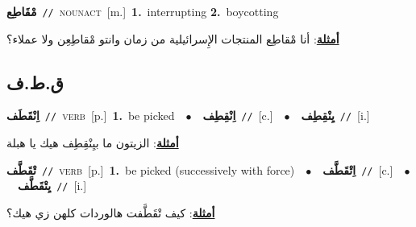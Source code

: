 \documentclass[10pt,a4paper,twoside]{article} %
\begin{document}
\begin{multicols}{2}
{\setlength\topsep{0pt}\textbf{\foreignlanguage{arabic}{مْقَاطِع}}\ {\color{gray}\texttt{//}\color{black}}\ \textsc{noun\textunderscore act}\ [m.]\ \textbf{1.}~interrupting  \textbf{2.}~boycotting\  \begin{flushright}\color{gray}\foreignlanguage{arabic}{\textbf{\underline{\foreignlanguage{arabic}{أمثلة}}}: أنا مْقاطِع المنتجات الإِسرائيلية من زمان وانتو مْقاطِعِن ولا عملاء؟}\end{flushright}\color{black}} \vspace{2mm}

\vspace{-3mm}
\subsection*{\color{blue}\foreignlanguage{arabic}{ق.ط.ف}\color{blue}{}} 

{\setlength\topsep{0pt}\textbf{\foreignlanguage{arabic}{اِنْقَطَف}}\ {\color{gray}\texttt{//}\color{black}}\ \textsc{verb}\ [p.]\ \textbf{1.}~be picked\ \ $\bullet$\ \ \setlength\topsep{0pt}\textbf{\foreignlanguage{arabic}{اِنْقِطِف}}\ {\color{gray}\texttt{//}\color{black}}\ [c.]\ \ $\bullet$\ \ \setlength\topsep{0pt}\textbf{\foreignlanguage{arabic}{يِنْقِطِف}}\ {\color{gray}\texttt{//}\color{black}}\ [i.]\  \begin{flushright}\color{gray}\foreignlanguage{arabic}{\textbf{\underline{\foreignlanguage{arabic}{أمثلة}}}: الزيتون ما بيِنْقِطِف هيك يا هبلة}\end{flushright}\color{black}} \vspace{2mm}

{\setlength\topsep{0pt}\textbf{\foreignlanguage{arabic}{تْقَطَّف}}\ {\color{gray}\texttt{//}\color{black}}\ \textsc{verb}\ [p.]\ \textbf{1.}~be picked (successively with force)\ \ $\bullet$\ \ \setlength\topsep{0pt}\textbf{\foreignlanguage{arabic}{اِتْقَطَّف}}\ {\color{gray}\texttt{//}\color{black}}\ [c.]\ \ $\bullet$\ \ \setlength\topsep{0pt}\textbf{\foreignlanguage{arabic}{يِتْقَطَّف}}\ {\color{gray}\texttt{//}\color{black}}\ [i.]\  \begin{flushright}\color{gray}\foreignlanguage{arabic}{\textbf{\underline{\foreignlanguage{arabic}{أمثلة}}}: كيف تْقَطَّفت هالوردات كلهن زي هيك؟}\end{flushright}\color{black}} \vspace{2mm}


\end{multicols}
\end{document}
